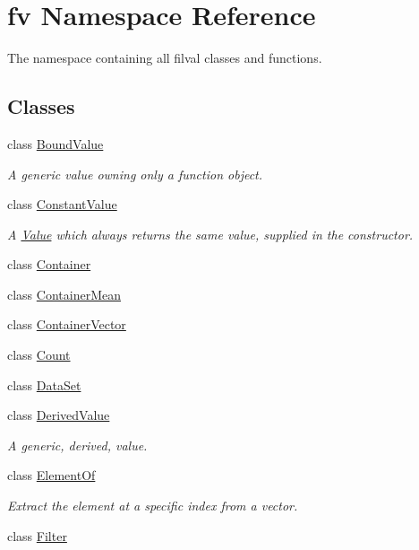 \hypertarget{namespacefv}{}\section{fv Namespace Reference}
\label{namespacefv}


The namespace containing all filval classes and functions.  


\subsection*{Classes}
\begin{DoxyCompactItemize}
\item 
class \hyperlink{classfv_1_1BoundValue}{Bound\+Value}
\begin{DoxyCompactList}\small\item\em A generic value owning only a function object. \end{DoxyCompactList}\item 
class \hyperlink{classfv_1_1ConstantValue}{Constant\+Value}
\begin{DoxyCompactList}\small\item\em A \hyperlink{classfv_1_1Value}{Value} which always returns the same value, supplied in the constructor. \end{DoxyCompactList}\item 
class \hyperlink{classfv_1_1Container}{Container}
\item 
class \hyperlink{classfv_1_1ContainerMean}{Container\+Mean}
\item 
class \hyperlink{classfv_1_1ContainerVector}{Container\+Vector}
\item 
class \hyperlink{classfv_1_1Count}{Count}
\item 
class \hyperlink{classfv_1_1DataSet}{Data\+Set}
\item 
class \hyperlink{classfv_1_1DerivedValue}{Derived\+Value}
\begin{DoxyCompactList}\small\item\em A generic, derived, value. \end{DoxyCompactList}\item 
class \hyperlink{classfv_1_1ElementOf}{Element\+Of}
\begin{DoxyCompactList}\small\item\em Extract the element at a specific index from a vector. \end{DoxyCompactList}\item 
class \hyperlink{classfv_1_1Filter}{Filter}

\end{DoxyCompactItemize}
